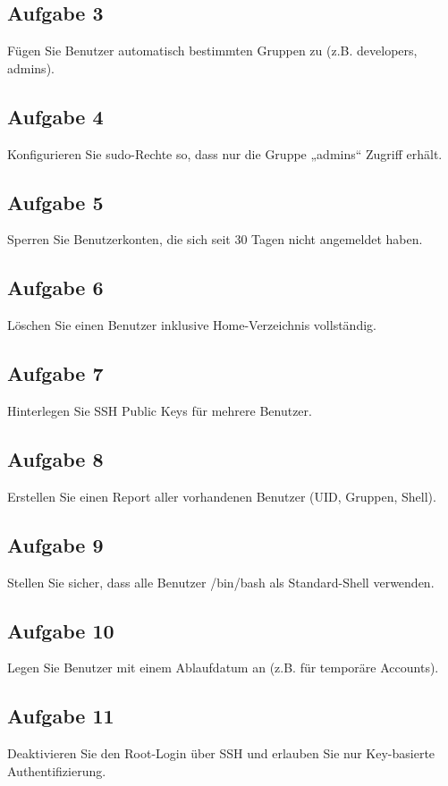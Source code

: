 \documentclass{article}
\begin{document}
    \subsection{Aufgabe 3}
    Fügen Sie Benutzer automatisch bestimmten Gruppen zu (z.B. developers, admins).

    \subsection{Aufgabe 4}
    Konfigurieren Sie sudo-Rechte so, dass nur die Gruppe „admins“ Zugriff erhält.

    \subsection{Aufgabe 5}
    Sperren Sie Benutzerkonten, die sich seit 30 Tagen nicht angemeldet haben.

    \subsection{Aufgabe 6}
    Löschen Sie einen Benutzer inklusive Home-Verzeichnis vollständig.

    \subsection{Aufgabe 7}
    Hinterlegen Sie SSH Public Keys für mehrere Benutzer.

    \subsection{Aufgabe 8}
    Erstellen Sie einen Report aller vorhandenen Benutzer (UID, Gruppen, Shell).

    \subsection{Aufgabe 9}
    Stellen Sie sicher, dass alle Benutzer /bin/bash als Standard-Shell verwenden.

    \subsection{Aufgabe 10}
    Legen Sie Benutzer mit einem Ablaufdatum an (z.B. für temporäre Accounts).

    \subsection{Aufgabe 11}
    Deaktivieren Sie den Root-Login über SSH und erlauben Sie nur Key-basierte Authentifizierung.
\end{document}
